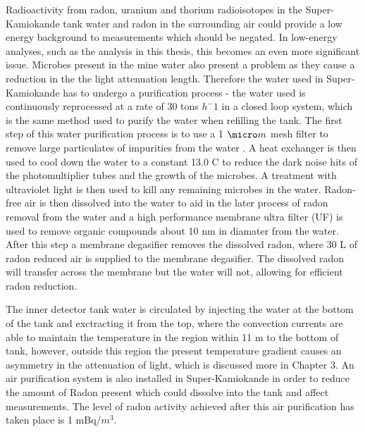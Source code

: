 Radioactivity from radon, uranium and thorium radioisotopes in the Super-Kamiokande tank water and radon in the surrounding air could provide a low energy background to measurements which should be negated. In low-energy analyses, such as the analysis in this thesis, this becomes an even more significant issue. Microbes present in the mine water also present a problem as they cause a reduction in the the light attenuation length. Therefore the water used in Super-Kamiokande has to undergo a purification process - the water used is continuously reprocessed at a rate of 30 tons $h^-1$ in a closed loop system, which is the same method used to purify the water when refilling the tank. The first step of this water purification process is to use a 1 $\micro m$ mesh filter to remove large particulates of impurities from the water \cite{fernandez_status_2016}. A heat exchanger is then used to cool down the water to a constant 13.0 \degree C to reduce the dark noise hits of the photomultiplier tubes and the growth of the microbes. A treatment with ultraviolet light is then used to kill any remaining microbes in the water. Radon-free air is then dissolved into the water to aid in the later process of radon removal from the water and a high performance membrane ultra filter (UF) is used to remove organic compounds about 10 nm in diamater from the water. After this step a membrane degasifier removes the dissolved radon, where 30 L of radon reduced air is supplied to the membrane degasifier. The dissolved radon will transfer across the membrane but the water will not, allowing for efficient radon reduction. 
\newline 

The inner detector tank water is circulated by injecting the water at the bottom of the tank and exctracting it from the top, where the convection currents are able to maintain the temperature in the region within 11 m to the bottom of tank, however, outside this region the present temperature gradient causes an asymmetry in the attenuation of light, which is discussed more in Chapter 3. 
\newline
 An air purification system is also installed in Super-Kamiokande in order to reduce the amount of Radon present which could dissolve into the tank and affect measurements. The level of radon activity achieved after this air purification has taken place is 1 mBq/$m^{3}$.

